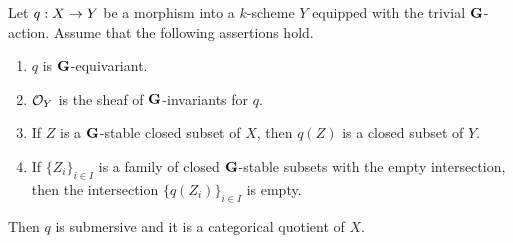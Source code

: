 \begin{theorem}\label{theorem:good_categorical_quotient_is_categorical}
Let $q:X\rightarrow Y$ be a morphism into a $k$-scheme $Y$ equipped with the trivial $\mathbf{G}$-action. Assume that the following assertions hold.
\begin{enumerate}[label=\emph{\textbf{(\arabic*)}}, leftmargin=3.0em]
\item $q$ is $\mathbf{G}$-equivariant.
\item ${\mathcal O}_Y$ is the sheaf of $\mathbf{G}$-invariants for $q$.
\item If $Z$ is a $\mathbf{G}$-stable closed subset of $X$, then $q(Z)$ is a closed subset of $Y$.
\item If $\{Z_i\}_{i\in I}$ is a family of closed $\mathbf{G}$-stable subsets with the empty intersection, then the intersection $\{q(Z_i)\}_{i\in I}$ is empty. 
\end{enumerate}
Then $q$ is submersive and it is a categorical quotient of $X$.
\end{theorem}
